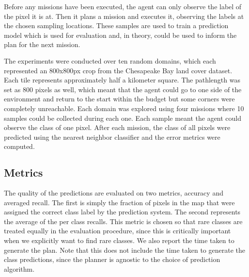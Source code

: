 Before any missions have been executed, the agent can only observe the label of the pixel it is at. Then it plans a mission and executes it, observing the labels at the chosen sampling locations. These samples are used to train a prediction model which is used for evaluation and, in theory, could be used to inform the plan for the next mission. 


The experiments were conducted over ten random domains, which each represented an 800x800px crop from the Chesapeake Bay land cover dataset. Each tile represents approximately half a kilometer square. The pathlength was set as 800 pixels as well, which meant that the agent could go to one side of the environment and return to the start within the budget but some corners were completely unreachable. Each domain was explored using four missions where 10 samples could be collected during each one. Each sample meant the agent could observe the class of one pixel. After each mission, the class of all pixels  were predicted using the nearest neighbor classifier and the error metrics were computed. 


\subsection{Metrics}
The quality of the predictions are evaluated on two metrics, accuracy and averaged recall. The first is simply the fraction of pixels in the map that were assigned the correct class label by the prediction system. The second represents the average of the per class recalls. This metric is chosen so that rare classes are treated equally in the evaluation procedure, since this is critically important when we explicitly want to find rare classes. We also report the time taken to generate the plan. Note that this does not include the time taken to generate the class predictions, since the planner is agnostic to the choice of prediction algorithm.



